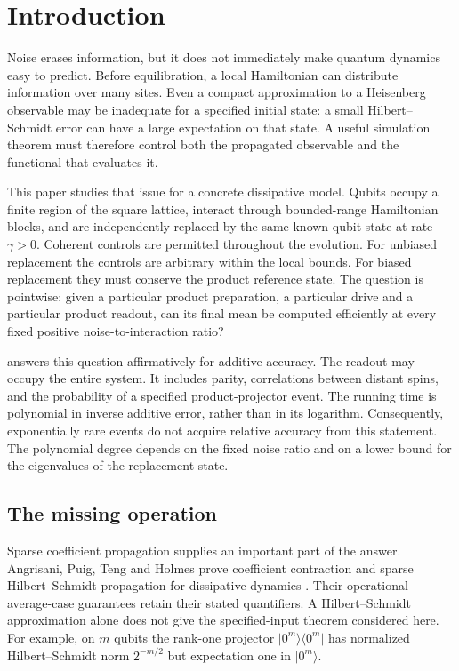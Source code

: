 \documentclass[11pt,reqno]{amsart}
\numberwithin{equation}{section}
\theoremstyle{definition}
\theoremstyle{remark}
\newcommand{\ket}[1]{\lvert#1\rangle}
\newcommand{\bra}[1]{\langle#1\rvert}
\begin{document}

\clearpage
\section{Introduction}

Noise erases information, but it does not immediately make quantum dynamics easy to predict. Before equilibration, a local Hamiltonian can distribute information over many sites. Even a compact approximation to a Heisenberg observable may be inadequate for a specified initial state: a small Hilbert--Schmidt error can have a large expectation on that state. A useful simulation theorem must therefore control both the propagated observable and the functional that evaluates it.

This paper studies that issue for a concrete dissipative model. Qubits occupy a finite region of the square lattice, interact through bounded-range Hamiltonian blocks, and are independently replaced by the same known qubit state at rate $\gamma>0$. Coherent controls are permitted throughout the evolution. For unbiased replacement the controls are arbitrary within the local bounds. For biased replacement they must conserve the product reference state. The question is pointwise: given a particular product preparation, a particular drive and a particular product readout, can its final mean be computed efficiently at every fixed positive noise-to-interaction ratio?

 answers this question affirmatively for additive accuracy. The readout may occupy the entire system. It includes parity, correlations between distant spins, and the probability of a specified product-projector event. The running time is polynomial in inverse additive error, rather than in its logarithm. Consequently, exponentially rare events do not acquire relative accuracy from this statement. The polynomial degree depends on the fixed noise ratio and on a lower bound for the eigenvalues of the replacement state.

\subsection{The missing operation}
Sparse coefficient propagation supplies an important part of the answer. Angrisani, Puig, Teng and Holmes prove coefficient contraction and sparse Hilbert--Schmidt propagation for dissipative dynamics \cite{APTH}. Their operational average-case guarantees retain their stated quantifiers. A Hilbert--Schmidt approximation alone does not give the specified-input theorem considered here. For example, on $m$ qubits the rank-one projector $\ket{0^m}\bra{0^m}$ has normalized Hilbert--Schmidt norm $2^{-m/2}$ but expectation one in $\ket{0^m}$.
\end{document}
